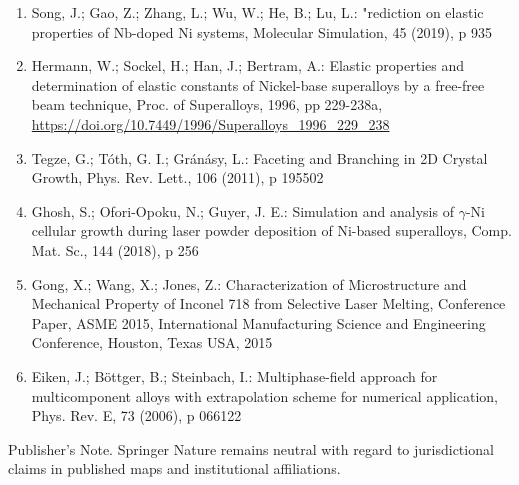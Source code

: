\documentclass[10pt]{article}
\begin{document}
\begin{enumerate}
  \item Song, J.; Gao, Z.; Zhang, L.; Wu, W.; He, B.; Lu, L.: "rediction on elastic properties of $\mathrm{Nb}$-doped $\mathrm{Ni}$ systems, Molecular Simulation, 45 (2019), p 935

  \item Hermann, W.; Sockel, H.; Han, J.; Bertram, A.: Elastic properties and determination of elastic constants of Nickel-base superalloys by a free-free beam technique, Proc. of Superalloys, 1996, pp 229-238a, \href{https://doi.org/10.7449/1996/Superalloys_1996_229_238}{https://doi.org/10.7449/1996/Superalloys\_1996\_229\_238}

  \item Tegze, G.; Tóth, G. I.; Gránásy, L.: Faceting and Branching in 2D Crystal Growth, Phys. Rev. Lett., 106 (2011), p 195502

  \item Ghosh, S.; Ofori-Opoku, N.; Guyer, J. E.: Simulation and analysis of $\gamma$-Ni cellular growth during laser powder deposition of Ni-based superalloys, Comp. Mat. Sc., 144 (2018), p 256

  \item Gong, X.; Wang, X.; Jones, Z.: Characterization of Microstructure and Mechanical Property of Inconel 718 from Selective Laser Melting, Conference Paper, ASME 2015, International Manufacturing Science and Engineering Conference, Houston, Texas USA, 2015

  \item Eiken, J.; Böttger, B.; Steinbach, I.: Multiphase-field approach for multicomponent alloys with extrapolation scheme for numerical application, Phys. Rev. E, 73 (2006), p 066122

\end{enumerate}

Publisher's Note. Springer Nature remains neutral with regard to jurisdictional claims in published maps and institutional affiliations.
\end{document}
